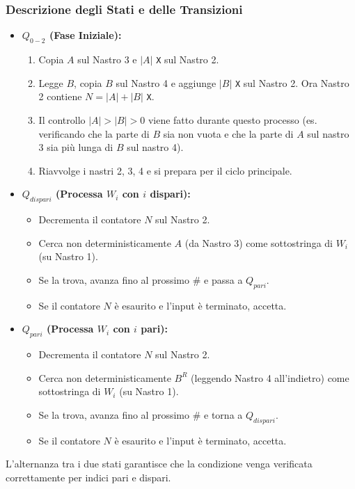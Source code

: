 \documentclass[a4paper]{article}
\theoremstyle{definition} %
\newcommand{\Sh}{\texttt{\#}} %
\begin{document}
\subsubsection{Descrizione degli Stati e delle Transizioni}
\begin{itemize}
    \item \textbf{$Q_{0-2}$ (Fase Iniziale):}
        \begin{enumerate}
            \item Copia $A$ sul Nastro 3 e $|A|$ \texttt{X} sul Nastro 2.
            \item Legge $B$, copia $B$ sul Nastro 4 e aggiunge $|B|$ \texttt{X} sul Nastro 2. Ora Nastro 2 contiene $N=|A|+|B|$ \texttt{X}.
            \item Il controllo $|A|>|B|>0$ viene fatto durante questo processo (es. verificando che la parte di $B$ sia non vuota e che la parte di $A$ sul nastro 3 sia più lunga di $B$ sul nastro 4).
            \item Riavvolge i nastri 2, 3, 4 e si prepara per il ciclo principale.
        \end{enumerate}
    \item \textbf{$Q_{dispari}$ (Processa $W_i$ con $i$ dispari):}
        \begin{itemize}
            \item Decrementa il contatore $N$ sul Nastro 2.
            \item Cerca non deterministicamente $A$ (da Nastro 3) come sottostringa di $W_i$ (su Nastro 1).
            \item Se la trova, avanza fino al prossimo $\Sh$ e passa a $Q_{pari}$.
            \item Se il contatore $N$ è esaurito e l'input è terminato, accetta.
        \end{itemize}
    \item \textbf{$Q_{pari}$ (Processa $W_i$ con $i$ pari):}
        \begin{itemize}
            \item Decrementa il contatore $N$ sul Nastro 2.
            \item Cerca non deterministicamente $B^R$ (leggendo Nastro 4 all'indietro) come sottostringa di $W_i$ (su Nastro 1).
            \item Se la trova, avanza fino al prossimo $\Sh$ e torna a $Q_{dispari}$.
            \item Se il contatore $N$ è esaurito e l'input è terminato, accetta.
        \end{itemize}
\end{itemize}
L'alternanza tra i due stati garantisce che la condizione venga verificata correttamente per indici pari e dispari.
\end{document}
